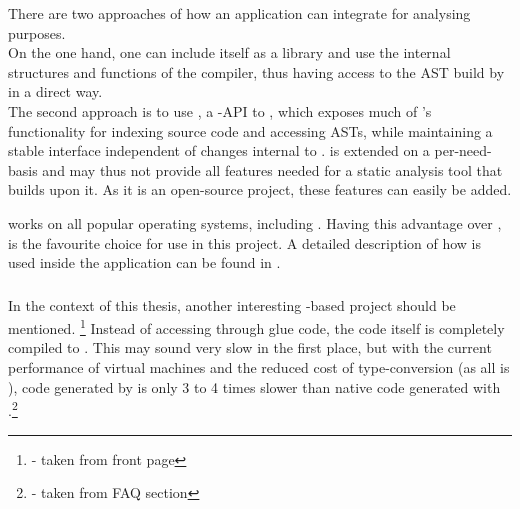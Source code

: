 There are two approaches of how an application can integrate  for analysing purposes.
\\On the one hand, one can include  itself as a library and use the internal structures and functions of the compiler, thus having access to the AST build by  in a direct way.
\\The second approach is to use , a -API to , which exposes much of 's functionality for indexing source code and accessing ASTs, while maintaining a stable interface independent of changes internal to .  is extended on a per-need-basis and may thus not provide all features needed for a static analysis tool that builds upon it. As it is an open-source project, these features can easily be added.

 works on all popular operating systems, including . Having this advantage over ,  is the favourite choice for use in this project. A detailed description of how  is used inside the application can be found in .

\subsubsection{}

In the context of this thesis, another interesting -based project should be mentioned. \footnote{\citep{EmscriptenHP} - taken from front page} Instead of accessing  through glue code, the  code itself is completely compiled to . This may sound very slow in the first place, but with the current performance of  virtual machines and the reduced cost of type-conversion (as all is ), code generated by  is only 3 to 4 times slower than native code generated with .\footnote{\citep{EmscriptenHP} - taken from FAQ section}